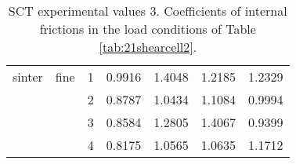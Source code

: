 \begin{table}
\begin{tabular}{ll|c|cccc}
\hline 
    sinter & fine  & 1     & 0.9916 & 1.4048 & 1.2185 & 1.2329 \\
          &       & 2     & 0.8787 & 1.0434 & 1.1084 & 0.9994 \\
          &       & 3     & 0.8584 & 1.2805 & 1.4067 & 0.9399 \\
          &       & 4     & 0.8175 & 1.0565 & 1.0635 & 1.1712 \\
         \hline
\end{tabular}
\caption[SCT experimental values 3]{\acs{SCT} experimental values 3.
Coefficients of internal frictions in the load conditions of Table
\ref{tab:21shearcell2}.}
\label{tab:22shearcell3}
\end{table}